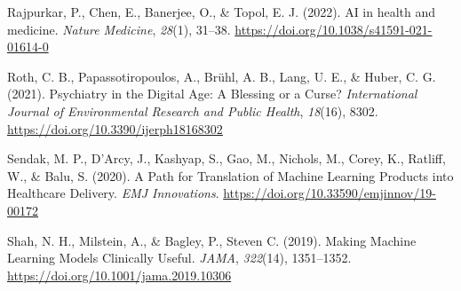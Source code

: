 \documentclass[
  man]{apa7}
\newlength{\cslhangindent}
\newlength{\cslentryspacingunit} %
\newenvironment{CSLReferences}[2] %
 {%
  \setlength{\parindent}{0pt}
  \ifodd #1
  \let\oldpar\par
  \def\par{\hangindent=\cslhangindent\oldpar}
  \fi
  \setlength{\parskip}{#2\cslentryspacingunit}
 }%
 {}
\begin{document}
\begin{CSLReferences}{1}{0}
\leavevmode{}%
Rajpurkar, P., Chen, E., Banerjee, O., \& Topol, E. J. (2022). {AI} in health and medicine. \emph{Nature Medicine}, \emph{28}(1), 31--38. \url{https://doi.org/10.1038/s41591-021-01614-0}

\leavevmode{}%
Roth, C. B., Papassotiropoulos, A., Brühl, A. B., Lang, U. E., \& Huber, C. G. (2021). Psychiatry in the {Digital} {Age}: {A} {Blessing} or a {Curse}? \emph{International Journal of Environmental Research and Public Health}, \emph{18}(16), 8302. \url{https://doi.org/10.3390/ijerph18168302}

\leavevmode{}%
Sendak, M. P., D'Arcy, J., Kashyap, S., Gao, M., Nichols, M., Corey, K., Ratliff, W., \& Balu, S. (2020). A {Path} for {Translation} of {Machine} {Learning} {Products} into {Healthcare} {Delivery}. \emph{EMJ Innovations}. \url{https://doi.org/10.33590/emjinnov/19-00172}

\leavevmode{}%
Shah, N. H., Milstein, A., \& Bagley, P., Steven C. (2019). Making {Machine} {Learning} {Models} {Clinically} {Useful}. \emph{JAMA}, \emph{322}(14), 1351--1352. \url{https://doi.org/10.1001/jama.2019.10306}

\end{CSLReferences}





\end{document}
